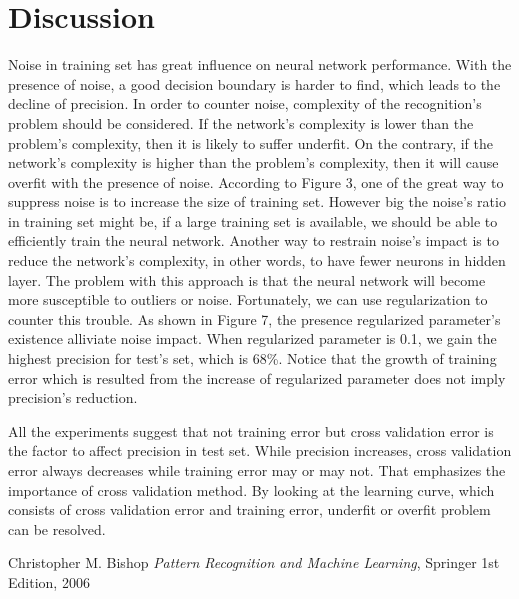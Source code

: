 \documentclass[a4paper, 11pt]{article}
\begin{document}
\section{Discussion}
Noise in training set has great influence on neural network performance. With the presence of noise, a good decision boundary is harder to find, which leads to the decline of precision. In order to counter noise, complexity of the recognition's problem should be considered. If the network's complexity is lower than the problem's complexity, then it is likely to suffer underfit. On the contrary, if the network's complexity is higher than the problem's complexity, then it will cause overfit with the presence of noise. According to Figure 3, one of the great way to suppress noise is to increase the size of training set. However big the noise's ratio in training set might be, if a large training set is available, we should be able to efficiently train the neural network. Another way to restrain noise's impact is to reduce the network's complexity, in other words, to have fewer neurons in hidden layer. The problem with this approach is that the neural network will become more susceptible to outliers or noise. Fortunately, we can use regularization to counter this trouble. As shown in Figure 7, the presence regularized parameter's existence alliviate noise impact. When regularized parameter is 0.1, we gain the highest precision for test's set, which is 68\%. Notice that the growth of training 
error which is resulted from the increase of regularized parameter does not imply precision's reduction.

All the experiments suggest that not training error but cross validation error is the factor to affect precision in test set. While precision increases, cross validation error always decreases while training error may or may not. That emphasizes the importance of cross validation method. By looking at the learning curve, which consists of cross validation error and training error, underfit or overfit problem can be resolved.
\newpage
\begin{thebibliography}{9}
  \label{itm:PRML}
  Christopher M. Bishop
  \emph{Pattern Recognition and Machine Learning},
  Springer
  1st Edition,
  2006
\end{thebibliography}
\end{document}
